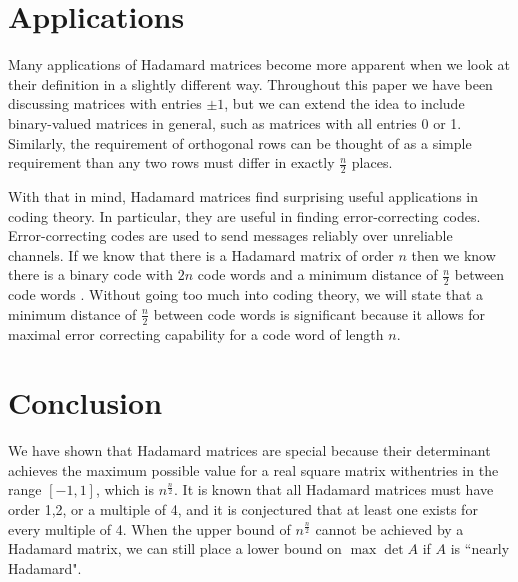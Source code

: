 \documentclass{article}
\theoremstyle{definition}
\begin{document}
\section{Applications}
Many applications of Hadamard matrices become more apparent when we look at their definition in a slightly different way. Throughout this paper we have been discussing matrices with entries $\pm 1$, but we can extend the idea to include binary-valued matrices in general, such as matrices with all entries 0 or 1. Similarly, the requirement of orthogonal rows can be thought of as a simple requirement than any two rows must differ in exactly $\frac n 2$ places.

With that in mind, Hadamard matrices find surprising useful applications in coding theory. In particular, they are useful in finding error-correcting codes. Error-correcting codes are used to send messages reliably over unreliable channels. If we know that there is a Hadamard matrix of order $n$ then we know there is a binary code with $2n$ code words and a minimum distance of $\frac n 2$ between code words \cite{applications}. Without going too much into coding theory, we will state that a minimum distance of $\frac n 2$ between code words is significant because it allows for maximal error correcting capability for a code word of length $n$.


\section{Conclusion}
We have shown that Hadamard matrices are special because their determinant achieves the maximum possible value for a real square matrix withentries in the range $[-1,1]$, which is  $n^{\frac{n}{2}}$. It is known that all Hadamard matrices must have order 1,2, or a multiple of 4, and it is conjectured that at least one exists for every multiple of 4. When the upper bound of $n^{\frac n 2}$ cannot be achieved by a Hadamard matrix, we can still place a lower bound on $\max \det A$ if $A$ is ``nearly Hadamard".
\end{document}
